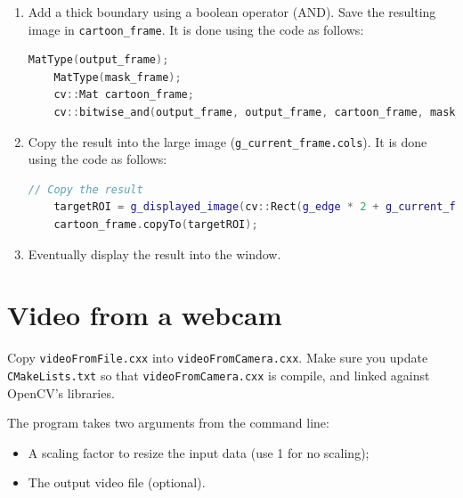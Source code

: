 \documentclass[english,a4paper,12pt,oneside]{article}
\begin{document}
\begin{enumerate}
\begin{lstlisting}[language=c++]
    cv::Mat output_frame;
#if CV_MAJOR_VERSION <= 3
    cv::resize(small_frame, output_frame, cv::Size(0, 0), ds_factor, ds_factor, CV_INTER_LINEAR);
#else
    cv::resize(small_frame, output_frame, cv::Size(0, 0), ds_factor, ds_factor, cv::INTER_LINEAR);
#endif
    \end{lstlisting}

\item Add a thick boundary using a boolean operator (AND).  Save the resulting image in \verb+cartoon_frame+. It is done using the code as follows:

\begin{lstlisting}[language=c++]
    MatType(output_frame);
    MatType(mask_frame);
    cv::Mat cartoon_frame;
    cv::bitwise_and(output_frame, output_frame, cartoon_frame, mask_frame);
 \end{lstlisting}

\item Copy the result into the large image (\verb+g_current_frame.cols+). It is done using the code as follows:

\begin{lstlisting}[language=c++]
    // Copy the result
    targetROI = g_displayed_image(cv::Rect(g_edge * 2 + g_current_frame.cols, g_edge, cartoon_frame.cols, cartoon_frame.rows));
    cartoon_frame.copyTo(targetROI);
 \end{lstlisting}

\item Eventually display the result into the window.
\end{enumerate}



\section{Video from a webcam}

Copy \verb+videoFromFile.cxx+ into \verb+videoFromCamera.cxx+. 
Make sure you update \verb+CMakeLists.txt+ so that \verb+videoFromCamera.cxx+ is compile, and linked against OpenCV's libraries.

The program takes two arguments from the command line:
\begin{itemize}
  \item A scaling factor to resize the input data (use 1 for no scaling);
  \item The output video file (optional).
\end{itemize}
\end{document}
